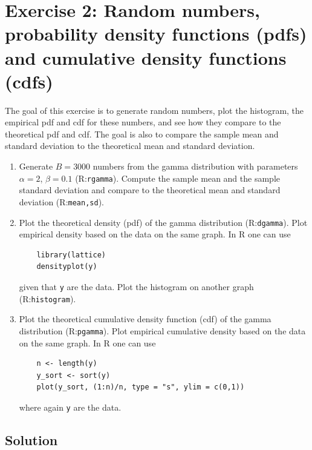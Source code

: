 \documentclass{report}
\begin{document}
\newpage

\section*{Exercise 2: Random numbers, probability density functions (pdfs) and cumulative density functions (cdfs)}

The goal of this exercise is to generate random numbers, plot the histogram, the empirical pdf and cdf for these numbers, and see how they compare to the theoretical pdf and cdf. The goal is also to compare the sample mean and standard deviation to the theoretical mean and standard deviation.

\begin{enumerate}[label=(\alph*)]
    \item Generate $B = 3000$ numbers from the gamma distribution with parameters $\alpha = 2$, $\beta = 0.1$ (\textsf{R}:\texttt{rgamma}). Compute the sample mean and the sample standard deviation and compare to the theoretical mean and standard deviation (\textsf{R}:\texttt{mean,sd}).
    \item Plot the theoretical density (pdf) of the gamma distribution (\textsf{R}:\texttt{dgamma}). Plot empirical density based on the data on the same graph. In \textsf{R} one can use
    \begin{verbatim}
    library(lattice)
    densityplot(y)
    \end{verbatim}
    given that \texttt{y} are the data. Plot the histogram on another graph (\textsf{R}:\texttt{histogram}).
    \item Plot the theoretical cumulative density function (cdf) of the gamma distribution (\textsf{R}:\texttt{pgamma}). Plot empirical cumulative density based on the data on the same graph. In \textsf{R} one can use
    \begin{verbatim}
    n <- length(y)
    y_sort <- sort(y)
    plot(y_sort, (1:n)/n, type = "s", ylim = c(0,1))
    \end{verbatim}
    where again \texttt{y} are the data.
\end{enumerate}

\subsection*{Solution}
\end{document}
